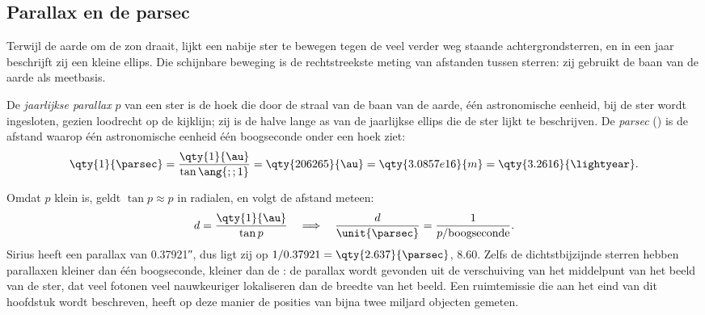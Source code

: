 \subsection*{Parallax en de parsec}

Terwijl de aarde om de zon draait, lijkt een nabije ster te bewegen tegen de veel
verder weg staande achtergrondsterren, en in een jaar beschrijft zij een kleine ellips.
Die schijnbare beweging is de rechtstreekste meting van afstanden tussen sterren: zij
gebruikt de baan van de aarde als meetbasis.

\begin{definition}\label{def:b1:observing-the-sky:parallax}
De \emph{jaarlijkse parallax} $p$ van een ster is de hoek die
door de straal van de baan van de aarde, één astronomische eenheid, bij de ster wordt
ingesloten, gezien loodrecht op de kijklijn; zij is de halve lange as van de jaarlijkse
ellips die de ster lijkt te beschrijven. De \emph{parsec} (\unit{\parsec})
is de afstand waarop één astronomische eenheid één boogseconde onder een hoek ziet:
\[
  \qty{1}{\parsec} = \frac{\qty{1}{\au}}{\tan\ang{;;1}} = \qty{206265}{\au}
  = \qty{3.0857e16}{m} = \qty{3.2616}{\lightyear} .
\]
\end{definition}

Omdat $p$ klein is, geldt $\tan p \approx p$ in radialen, en volgt de afstand meteen:
\[
  d = \frac{\qty{1}{\au}}{\tan p} \quad\Longrightarrow\quad
  \frac{d}{\unit{\parsec}} = \frac{1}{p/\text{boogseconde}} .
\]
Sirius heeft een parallax van \ang{;;0.37921}, dus ligt zij op $1/0.37921 =
\qty{2.637}{\parsec}$, \qty{8.60}{\lightyear}. Zelfs de dichtstbijzijnde sterren hebben
parallaxen kleiner dan één boogseconde, kleiner dan de : de parallax wordt gevonden
uit de verschuiving van het middelpunt van het beeld van de ster, dat veel fotonen veel
nauwkeuriger lokaliseren dan de breedte van het beeld. Een ruimtemissie die aan het eind
van dit hoofdstuk wordt beschreven, heeft op deze manier de posities van bijna twee
miljard objecten gemeten.

